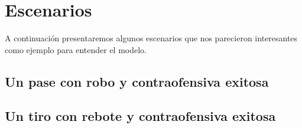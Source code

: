 \section{Escenarios}

A continuación presentaremos algunos escenarios que nos parecieron interesantes como ejemplo para entender el modelo.

\subsection{Un pase con robo y contraofensiva exitosa}


\subsection{Un tiro con rebote y contraofensiva exitosa}
